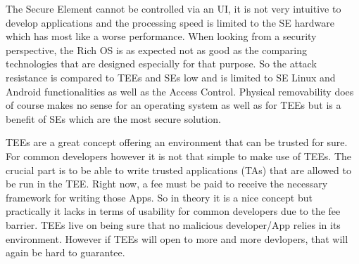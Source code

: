 The Secure Element cannot be controlled via an UI, it is not very intuitive
to develop applications and the processing speed is limited to the SE hardware
which has most like a worse performance. When looking from a security perspective, the Rich OS is as expected not as good as the comparing technologies that are designed especially for that purpose. So the attack resistance is compared to TEEs and SEs low and is limited to SE Linux and Android functionalities as well as the Access Control. Physical removability
does of course makes no sense for an operating system as well as for TEEs but
is a benefit of SEs which are the most secure solution.

TEEs are a great concept offering an environment that can be trusted for sure.
For common developers however it is not that simple to make use of TEEs.
The crucial part is to be able to write trusted applications (TAs) that are
allowed to be run in the TEE. Right now, a fee must be paid to receive the
necessary framework for writing those Apps. So in theory it is a nice concept
but practically it lacks in terms of usability for common developers due
to the fee barrier. TEEs live on being sure that no malicious developer/App relies in its environment. However if TEEs will open to more and more devlopers, that will again be hard to guarantee.






